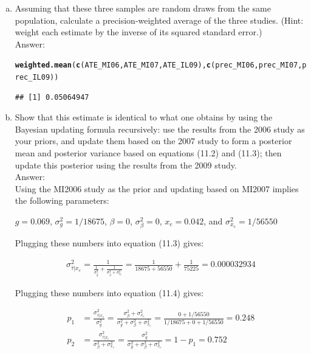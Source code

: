 \documentclass[11pt,notitlepage]{article}\usepackage[]{graphicx}\usepackage[]{color}
\makeatletter
\newcommand{\hlstd}[1]{\textcolor[rgb]{0.345,0.345,0.345}{#1}}%
\newcommand{\hlkwd}[1]{\textcolor[rgb]{0.737,0.353,0.396}{\textbf{#1}}}%
\newenvironment{kframe}{%
 \def\at@end@of@kframe{}%
 \ifinner\ifhmode%
  \def\at@end@of@kframe{\end{minipage}}%
  \begin{minipage}{\columnwidth}%
 \fi\fi%
 \def\FrameCommand##1{\hskip\@totalleftmargin \hskip-\fboxsep
 \colorbox{shadecolor}{##1}\hskip-\fboxsep
     \hskip-\linewidth \hskip-\@totalleftmargin \hskip\columnwidth}%
 \MakeFramed {\advance\hsize-\width
   \@totalleftmargin\z@ \linewidth\hsize
   \@setminipage}}%
 {\par\unskip\endMakeFramed%
 \at@end@of@kframe}
\newenvironment{knitrout}{}{} %
\makeatother
\begin{document}
\begin{enumerate}[a)]
\item Assuming that these three samples are random draws from the same population, calculate a precision-weighted average of the three studies. (Hint: weight each estimate by the inverse of its squared standard error.)\\
Answer:\\

\begin{knitrout}
\color{fgcolor}\begin{kframe}
\begin{alltt}
\hlkwd{weighted.mean}\hlstd{(}\hlkwd{c}\hlstd{(ATE_MI06, ATE_MI07, ATE_IL09),} \hlkwd{c}\hlstd{(prec_MI06, prec_MI07, prec_IL09))}
\end{alltt}
\begin{verbatim}
## [1] 0.05064947
\end{verbatim}
\end{kframe}
\end{knitrout}


\item Show that this estimate is identical to what one obtains by using the Bayesian updating formula recursively: use the results from the 2006 study as your priors, and update them based on the 2007 study to form a posterior mean and posterior variance based on equations (11.2) and (11.3); then update this posterior using the results from the 2009 study.\\
Answer:\\

Using the MI2006 study as the prior and updating based on MI2007 implies the following parameters:

$g=0.069$, $\sigma^2_g = 1/18675$, $\beta = 0$, $\sigma^2_{\beta} = 0$, $x_e = 0.042$, and $\sigma^2_{x_e} = 1/56550$

Plugging these numbers into equation (11.3) gives: 

 \begin{align*}
\sigma^2_{\bar{\tau}|x_e} = \frac{1}{\frac{1}{\sigma^2_g} + \frac{1}{\sigma^2_{\beta} + \sigma^2_{x_e}}} = \frac{1}{18675+56550 }+ \frac{1}{75225} = 0.000032934
\end{align*}
 
Plugging these numbers into equation (11.4) gives: 

\begin{align*}
p_1 &= \frac{\sigma^2_{\bar{\tau}|x_e}}{\sigma^2_g} = \frac{\sigma^2_{\beta} + \sigma^2_{x_e}}{\sigma^2_g +\sigma^2_{\beta} + \sigma^2_{x_e}} = \frac{0+1/56550}{1/18675+0+1/56550} = 0.248\\
p_2 &= \frac{\sigma^2_{\bar{\tau}|x_e}}{\sigma^2_{\beta} + \sigma^2_{x_e}} = \frac{\sigma^2_g}{\sigma^2_g +\sigma^2_{\beta} + \sigma^2_{x_e}} = 1 - p_1 = 0.752
\end{align*}


\end{enumerate}
\end{document}
